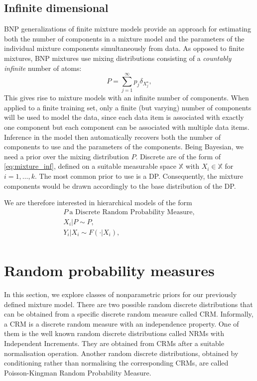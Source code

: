 \subsection{Infinite dimensional}
\acrlong{BNP} generalizations of finite mixture models provide an approach for estimating both the number of components in a mixture model and the parameters of the individual mixture components simultaneously from data. As opposed to finite mixtures, \gls{BNP} mixtures use mixing distributions consisting of a \textit{countably infinite} number of atoms:
\begin{equation} \label{eq:mixture_inf}
P = \sum_{j=1}^\infty p_j \delta_{X_j^\star},
\end{equation}
This gives rise to mixture models with an infinite number of components. When applied to a finite training set, only a finite (but varying) number of components will be used to model the data, since each data item is associated with exactly one component but each component can be associated with multiple data items.
Inference in the model then automatically recovers both the number of components to use and the parameters of the components.
Being Bayesian, we need a prior over the mixing distribution $P$. %
Discrete  are of the form of \ref{eq:mixture_inf}, defined on a suitable measurable space $\mathbb{X}$ with $X_i \in \mathbb{X}$ for $i=1,\dots,k$.
The most common prior to use is a \gls{DP}.
Consequently, the mixture components would be drawn accordingly to the base distribution of the \gls{DP}.


We are therefore interested in hierarchical models of the form
\begin{gather*}
P \ \text{a Discrete Random Probability Measure}, \\
X_i|P \sim P, \\
Y_i|X_i \sim F(\cdot|X_i), \\
\end{gather*}


\section{Random probability measures}
In this section, we explore classes of nonparametric priors for our previously defined mixture model.
There are two possible random discrete distributions that can be obtained from a specific discrete random measure called \acrfull{CRM}. Informally, a \gls{CRM} is a discrete random measure with an independence property. One of them is the well known random discrete distributions called \acrlong{NRM}s with Independent Increments. They are obtained from \glspl{CRM} after a suitable normalisation operation. Another random discrete distributions, obtained by conditioning rather than normalising the corresponding \glspl{CRM}, are called Poisson-Kingman Random Probability Measure.

